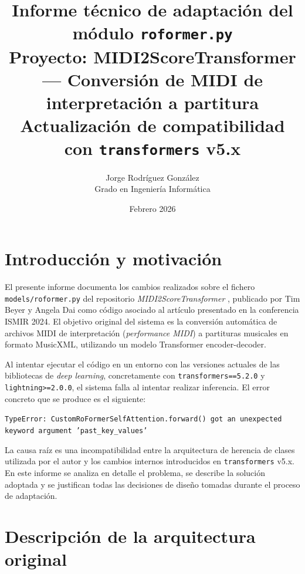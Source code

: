 \documentclass[12pt,a4paper]{article}
\title{
  \vspace{-1cm}
  \Large\textbf{Informe técnico de adaptación del módulo \texttt{roformer.py}}\\[0.4em]
  \large Proyecto: MIDI2ScoreTransformer ---
  Conversión de MIDI de interpretación a partitura\\[0.4em]
  \normalsize Actualización de compatibilidad con \texttt{transformers} v5.x
}
\author{
  Jorge Rodríguez González\\
  \small Grado en Ingeniería Informática\\
}
\date{Febrero 2026}
\begin{document}

\maketitle
\thispagestyle{fancy}

\tableofcontents
\newpage

\section{Introducción y motivación}

El presente informe documenta los cambios realizados sobre el fichero \texttt{models/roformer.py}
del repositorio \textit{MIDI2ScoreTransformer} \cite{beyer2024}, publicado por Tim Beyer y Angela Dai
como código asociado al artículo presentado en la conferencia ISMIR 2024. El objetivo original del
sistema es la conversión automática de archivos MIDI de interpretación (\textit{performance MIDI})
a partituras musicales en formato MusicXML, utilizando un modelo Transformer encoder-decoder.

Al intentar ejecutar el código en un entorno con las versiones actuales de las bibliotecas
de \textit{deep learning}, concretamente con \texttt{transformers==5.2.0} y
\texttt{lightning>=2.0.0}, el sistema falla al intentar realizar inferencia. El error concreto
que se produce es el siguiente:

\begin{errorbox}
\texttt{TypeError: CustomRoFormerSelfAttention.forward() got an unexpected keyword argument 'past\_key\_values'}
\end{errorbox}

La causa raíz es una incompatibilidad entre la arquitectura de herencia de clases utilizada
por el autor y los cambios internos introducidos en \texttt{transformers} v5.x. En este
informe se analiza en detalle el problema, se describe la solución adoptada y se justifican
todas las decisiones de diseño tomadas durante el proceso de adaptación.

\section{Descripción de la arquitectura original}
\end{document}
